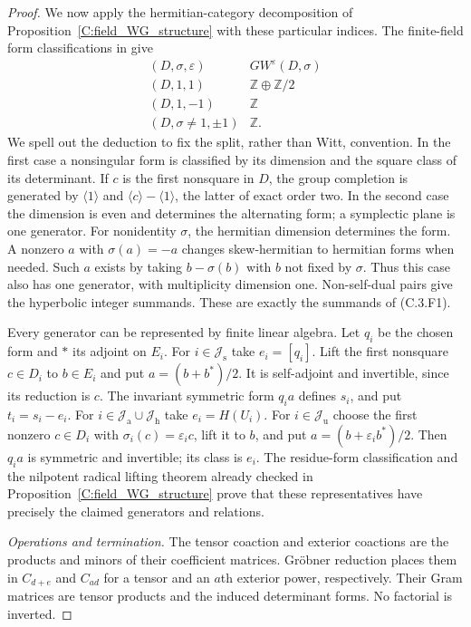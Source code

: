 \begin{proof}
We now apply the hermitian-category decomposition of
Proposition~\ref{C:field_WG_structure} with these particular indices.
The finite-field form classifications in
\cite[Lemma 3.1(a),(b)]{C-SergeichukFiniteForms} give
\[
 \begin{array}{c|c}
 (D,\sigma,\varepsilon)&GW^\varepsilon(D,\sigma)\\ \hline
 (D,1,1)&\mathbb Z\oplus\mathbb Z/2\\
 (D,1,-1)&\mathbb Z\\
 (D,\sigma\ne1,\pm1)&\mathbb Z.
 \end{array}                                               \tag{C.3.F2}
\]
We spell out the deduction to fix the split, rather than Witt, convention.
In the first case a nonsingular form is classified by its dimension and
the square class of its determinant. If $c$ is the first nonsquare in
$D$, the group completion is generated by $\langle1\rangle$ and
$\langle c\rangle-\langle1\rangle$, the latter of exact order two.
In the second case the dimension is even and determines the alternating
form; a symplectic plane is one generator. For nonidentity $\sigma$,
the hermitian dimension determines the form. A nonzero $a$ with
$\sigma(a)=-a$ changes skew-hermitian to hermitian forms when needed.
Such $a$ exists by taking $b-\sigma(b)$ with $b$ not fixed by $\sigma$.
Thus this case also has one generator, with multiplicity dimension one.
Non-self-dual pairs give the hyperbolic integer summands. These are
exactly the summands of (C.3.F1).

Every generator can be represented by finite linear algebra. Let $q_i$
be the chosen form and $*$ its adjoint on $E_i$. For
$i\in\mathscr J_{\mathrm s}$ take $e_i=[q_i]$. Lift the first nonsquare
$c\in D_i$ to $b\in E_i$ and put $a=(b+b^*)/2$. It is self-adjoint
and invertible, since its reduction is $c$. The invariant symmetric
form $q_i a$ defines $s_i$, and put $t_i=s_i-e_i$.
For $i\in\mathscr J_{\mathrm a}\cup\mathscr J_{\mathrm h}$ take
$e_i=H(U_i)$. For $i\in\mathscr J_{\mathrm u}$ choose the first nonzero
$c\in D_i$ with $\sigma_i(c)=\varepsilon_i c$, lift it to $b$, and put
$a=(b+\varepsilon_i b^*)/2$. Then $q_i a$ is symmetric and invertible;
its class is $e_i$. The residue-form classification and the nilpotent
radical lifting theorem already checked in
Proposition~\ref{C:field_WG_structure} prove that these representatives
have precisely the claimed generators and relations.

\emph{Operations and termination.}
The tensor coaction and exterior coactions are the products and minors
of their coefficient matrices. Gr\"obner reduction places them in
$C_{d+e}$ and $C_{ad}$ for a tensor and an $a$th exterior power,
respectively. Their Gram matrices are tensor products and the induced
determinant forms. No factorial is inverted.


\end{proof}
